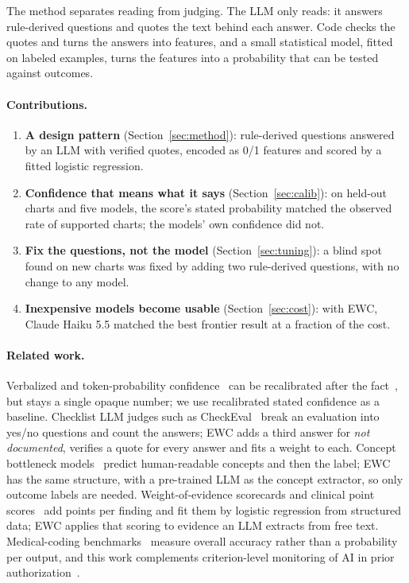 \documentclass[10pt,letterpaper]{article}
\newcommand{\nd}{\textit{not documented}}
\begin{document}
The method separates reading from judging. The LLM only reads: it answers rule-derived questions and quotes the text behind each answer. Code checks the quotes and turns the answers into features, and a small statistical model, fitted on labeled examples, turns the features into a probability that can be tested against outcomes.

\paragraph{Contributions.}
\begin{enumerate}
  \item \textbf{A design pattern} (Section~\ref{sec:method}): rule-derived questions answered by an LLM with verified quotes, encoded as 0/1 features and scored by a fitted logistic regression.
  \item \textbf{Confidence that means what it says} (Section~\ref{sec:calib}): on held-out charts and five models, the score's stated probability matched the observed rate of supported charts; the models' own confidence did not.
  \item \textbf{Fix the questions, not the model} (Section~\ref{sec:tuning}): a blind spot found on new charts was fixed by adding two rule-derived questions, with no change to any model.
  \item \textbf{Inexpensive models become usable} (Section~\ref{sec:cost}): with EWC, Claude Haiku 5.5 matched the best frontier result at a fraction of the cost.
\end{enumerate}

\paragraph{Related work.} Verbalized and token-probability confidence~\cite{xiong,leng} can be recalibrated after the fact~\cite{platt}, but stays a single opaque number; we use recalibrated stated confidence as a baseline. Checklist LLM judges such as CheckEval~\cite{checkeval} break an evaluation into yes/no questions and count the answers; EWC adds a third answer for \nd, verifies a quote for every answer and fits a weight to each. Concept bottleneck models~\cite{cbm} predict human-readable concepts and then the label; EWC has the same structure, with a pre-trained LLM as the concept extractor, so only outcome labels are needed. Weight-of-evidence scorecards and clinical point scores~\cite{good} add points per finding and fit them by logistic regression from structured data; EWC applies that scoring to evidence an LLM extracts from free text. Medical-coding benchmarks~\cite{soroush} measure overall accuracy rather than a probability per output, and this work complements criterion-level monitoring of AI in prior authorization~\cite{zeinoun}.
\end{document}
